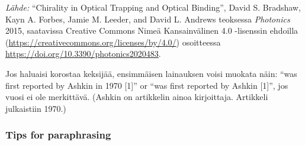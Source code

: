 \documentclass[finnish, 12pt, a4paper, elec, utf8, a-2b, online]{aaltothesis}
\begin{document}

\vspace{1ex}
\noindent
\textit{Lähde:} “Chirality in Optical Trapping and Optical Binding”, David S.
Bradshaw, Kayn A. Forbes, Jamie M. Leeder, and David L. Andrews teoksessa 
\textit{Photonics} 2015, saatavissa Creative Commons Nimeä Kansainvälinen 4.0 
-lisenssin ehdoilla (\url{https://creativecommons.org/licenses/by/4.0/}) 
osoitteessa \url{https://doi.org/10.3390/photonics2020483}.

Jos haluaisi korostaa keksijää, ensimmäisen lainauksen voisi muokata näin: “was 
first reported by Ashkin in 1970 [1]” or “was first reported by Ashkin [1]”, jos 
vuosi ei ole merkittävä. (Ashkin on artikkelin ainoa kirjoittaja. Artikkeli 
julkaistiin 1970.)

\subsubsection*{Tips for paraphrasing}
\end{document}
